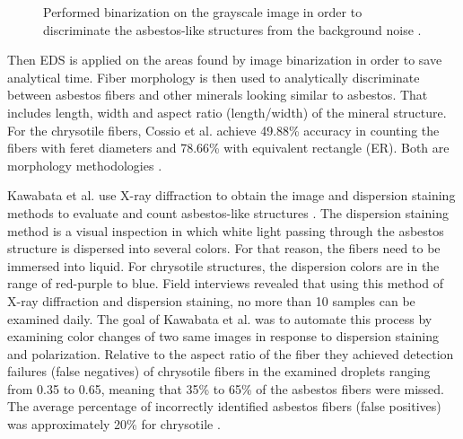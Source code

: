 \begin{figure}[h]
\centering
\caption{Performed binarization on the grayscale image in order to discriminate the asbestos-like structures from the background noise \cite{cossio2018innovative}. }
\label{fig:binarization}
\end{figure}

Then EDS is applied on the areas found by image binarization in order to save analytical time. Fiber morphology is then used to analytically discriminate between asbestos fibers and other minerals looking similar to asbestos. That includes length, width and aspect ratio (length/width) of the mineral structure. For the chrysotile fibers, Cossio et al. achieve 49.88\% accuracy in counting the fibers with feret diameters and 78.66\% with equivalent rectangle (ER). Both are morphology methodologies \cite{cossio2018innovative}.

Kawabata et al. use X-ray diffraction to obtain the image and dispersion staining methods to evaluate and count asbestos-like structures \cite{kawabata2009asbestos}. The dispersion staining method is a visual inspection in which white light passing through the asbestos structure is dispersed into several colors. For that reason, the fibers need to be immersed into liquid. For chrysotile structures, the dispersion colors are in the range of red-purple to blue. Field interviews revealed that using this method of X-ray diffraction and dispersion staining, no more than 10 samples can be examined daily. The goal of Kawabata et al. was to automate this process by examining color changes of two same images in response to dispersion staining and polarization. Relative to the aspect ratio of the fiber they achieved detection failures (false negatives) of chrysotile fibers in the examined droplets ranging from 0.35 to 0.65, meaning that 35\% to 65\% of the asbestos fibers were missed. The average percentage of incorrectly identified asbestos fibers (false positives) was approximately 20\% for chrysotile \cite{kawabata2009asbestos}. 


